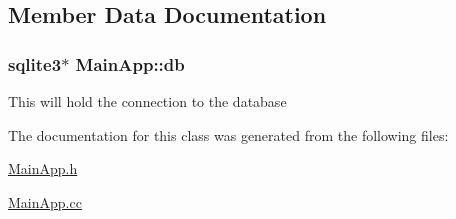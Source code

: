 \subsection{Member Data Documentation}
\hypertarget{classMainApp_a2d0975ce785555e698fb85c697f303bd}{
\subsubsection[{db}]{\setlength{\rightskip}{0pt plus 5cm}sqlite3$\ast$ Main\-App\-::db}}\label{de/dab/classMainApp_a2d0975ce785555e698fb85c697f303bd}
This will hold the connection to the database 

The documentation for this class was generated from the following files\-:\begin{DoxyCompactItemize}
\item 
\hyperlink{MainApp_8h}{Main\-App.\-h}\item 
\hyperlink{MainApp_8cc}{Main\-App.\-cc}\end{DoxyCompactItemize}

